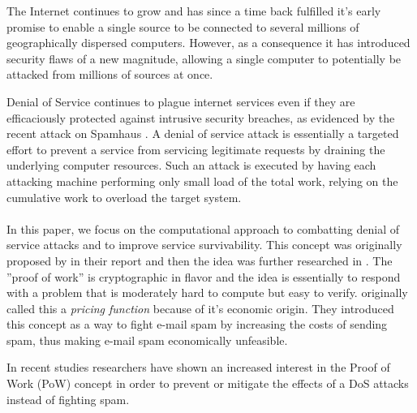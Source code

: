 The Internet continues to grow and has since a time back fulfilled it's early promise to enable a single source to be connected to several millions of geographically dispersed computers. However, as a consequence it has introduced security flaws of a new magnitude, allowing a single computer to potentially be attacked from millions of sources at once.

Denial of Service continues to plague internet services even if they are efficaciously protected against intrusive security breaches, as evidenced by the recent attack on Spamhaus \cite{BBC}. A denial of service attack is essentially a targeted effort to prevent a service from servicing legitimate requests by draining the underlying computer resources. Such an attack is executed by having each attacking machine performing only small load of the total work, relying on the cumulative work to overload the target system. 
\\
\\
In this paper, we focus on the computational approach to combatting denial of service attacks and to improve service survivability. This concept was originally proposed by \citeauthor{DworkN92} in their report  and then the idea was further researched in . The ''proof of work'' is cryptographic in flavor and the idea is essentially to respond with a problem that is moderately hard to compute but easy to verify. \citeauthor{DworkN92} originally called this a \emph{pricing function} because of it's economic origin. They introduced this concept as a way to fight e-mail spam by increasing the costs of sending spam, thus making e-mail spam economically unfeasible.

In recent studies researchers have shown an increased interest in the Proof of Work (PoW) concept in order to prevent or mitigate the effects of a DoS attacks instead of fighting spam.



